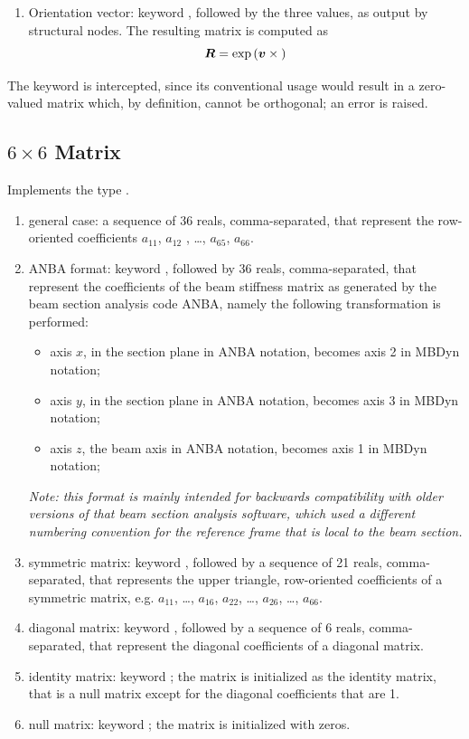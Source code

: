 \begin{enumerate}
\item Orientation vector: keyword , followed by the three
values, as output by structural nodes.
The resulting matrix is computed as
\begin{equation}
	\boldsymbol{R} = \exp\left( \boldsymbol{v}\times{} \right)
\end{equation}
\end{enumerate}

The keyword  is intercepted, since its conventional usage
would result in a zero-valued matrix which, by definition, cannot be orthogonal;
an error is raised.

\subsection{$6 \times 6$ Matrix}
\label{sec:Mat6x6}
Implements the type .
\begin{enumerate}
    \item general case: a sequence of 36 reals, comma-separated, that
    represent the row-oriented coefficients $ a_{11} $, $ a_{12}$ ,
    \ldots, $ a_{65} $, $ a_{66} $.
    \item ANBA format: keyword , followed by 36 reals, 
    comma-separated, that represent the coefficients of the beam stiffness
    matrix as generated by the beam section analysis code ANBA,
    namely the following transformation is performed:
    \begin{itemize}
        \item axis $ x $, in the section plane in ANBA notation, 
	becomes axis 2 in MBDyn notation;    
	\item axis $ y $, in the section plane in ANBA notation, 
	becomes axis 3 in MBDyn notation;    
	\item axis $ z $, the beam axis in ANBA notation, 
	becomes axis 1 in MBDyn notation;    
    \end{itemize}
    \emph{Note: this format is mainly intended for backwards compatibility
    with older versions of that beam section analysis software,
    which used a different numbering convention for the reference frame
    that is local to the beam section.}
    \item symmetric matrix: keyword , followed by a sequence
    of 21 reals, comma-separated, that represents the upper triangle,
    row-oriented coefficients of a symmetric matrix, 
    e.g. $ a_{11} $, \ldots , $ a_{16} $, $ a_{22} $,
    \ldots , $ a_{26} $, \ldots, $ a_{66} $.
    \item diagonal matrix: keyword , followed by a sequence
    of 6 reals, comma-separated, that represent the diagonal coefficients 
    of a diagonal matrix.
    \item identity matrix: keyword ; the matrix is initialized
    as the identity matrix, that is a null matrix except for the diagonal 
    coefficients that are 1.
    \item null matrix: keyword ; the matrix is initialized 
    with zeros.
\end{enumerate}
